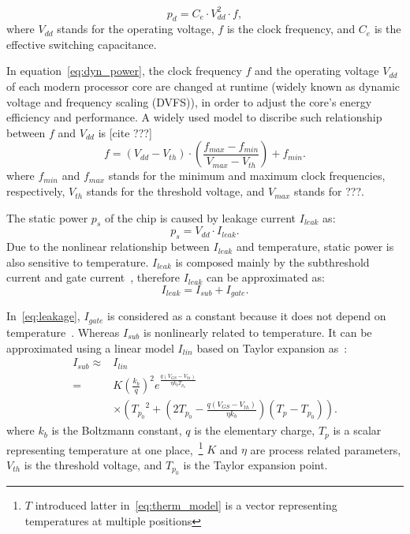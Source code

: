 \begin{equation}\label{eq:dyn_power}
p_{d} = C_{e} \cdot V_{dd}^{2} \cdot f,
\end{equation}
where $V_{dd}$ stands for the operating voltage, $f$ is the clock frequency, and $C_{e}$ is the effective switching capacitance.

In equation~\eqref{eq:dyn_power}, the clock frequency $f$ and the operating voltage $V_{dd}$ of each modern processor core are changed at runtime (widely known as dynamic voltage and frequency scaling (DVFS)), in order to adjust the core's energy efficiency and performance. 
A widely used model to discribe such relationship between $f$ and $V_{dd}$ is [cite ???]
\begin{equation}\label{eq:f_v}
f = (V_{dd}-V_{th}) \cdot \left(\frac{f_{max}-f_{min}}{V_{max}-V_{th}}\right)+f_{min}.
\end{equation}
where $f_{min}$ and $f_{max}$ stands for the minimum and maximum clock frequencies, respectively, $V_{th}$ stands for the threshold voltage, and $V_{max}$ stands for ???.

The static power $p_{s}$ of the chip is caused by leakage current $I_{leak}$ as:
\begin{equation}\label{eq:sta_power}
p_{s} =V_{dd} \cdot I_{leak}.
\end{equation}
Due to the nonlinear relationship between $I_{leak}$ and temperature, static power is also sensitive to temperature. $I_{leak}$ is composed mainly by the subthreshold current and gate current~\cite{Liu:DATE'07,ShenTan:TODAES'12,WangWan:TOC'18}, therefore $I_{leak}$ can be approximated as:
\begin{equation}\label{eq:leakage}
I_{leak}=I_{sub}+I_{gate}.
\end{equation}

In~\eqref{eq:leakage}, $I_{gate}$ is considered as a constant because it does not depend on temperature~\cite{WangWan:TOC'18}. Whereas $I_{sub}$ is nonlinearly related to temperature. It can be approximated using a linear model $I_{lin}$ based on Taylor expansion as~\cite{WangWan:TOC'18}:
\begin{equation}\label{eq:sub_current_lin}
  \begin{split}
    I_{sub} \approx & I_{lin} \\
     =& K \left(\frac{k_b}{q}\right)^2 e^{\frac{q(V_{GS}-V_{th})}{\eta k_b
    T_{p_0}}}\\
&\times \left({T_{p_0}}^2 + \left(2T_{p_0} - \frac{q(V_{GS}-V_{th})}{\eta
  k_b}\right)(T_p-T_{p_0})\right).
\end{split}
\end{equation}
where $k_b$ is the Boltzmann constant, $q$ is the elementary charge, $T_{p}$ is a scalar representing temperature at one place,~\footnote{$T$
introduced latter in~\eqref{eq:therm_model} is a vector representing temperatures at multiple positions} $K$ and $\eta$ are
process related parameters, $V_{th}$ is the threshold voltage, and $T_{p_0}$ is the Taylor expansion point.

